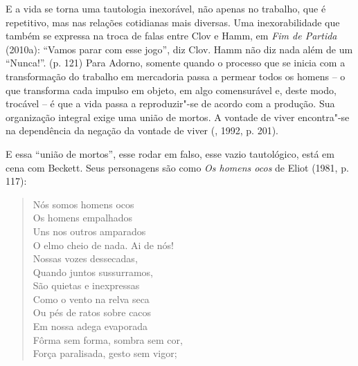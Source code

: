 E a vida se torna uma tautologia inexorável, não apenas no trabalho, que
é repetitivo, mas nas relações cotidianas mais diversas. Uma
inexorabilidade que também se expressa na troca de falas entre Clov e
Hamm, em \emph{Fim de Partida} (2010a): ``Vamos parar com esse jogo'',
diz Clov. Hamm não diz nada além de um ``Nunca!''. (p. 121) Para Adorno,
somente quando o processo que se inicia com a transformação do trabalho
em mercadoria passa a permear todos os homens -- o que transforma cada
impulso em objeto, em algo comensurável e, deste modo, trocável -- é que
a vida passa a reproduzir"-se de acordo com a produção. Sua organização
integral exige uma união de mortos. A vontade de viver encontra"-se na
dependência da negação da vontade de viver (, 1992, p. 201).

E essa ``união de mortos'', esse rodar em falso, esse vazio tautológico,
está em cena com Beckett. Seus personagens são como \emph{Os
homens ocos} de Eliot (1981, p. 117):

\begin{verse}
Nós somos homens ocos\\
Os homens empalhados\\
Uns nos outros amparados\\
O elmo cheio de nada. Ai de nós!\\
Nossas vozes dessecadas,\\
Quando juntos sussurramos,\\
São quietas e inexpressas\\
Como o vento na relva seca\\
Ou pés de ratos sobre cacos\\
Em nossa adega evaporada\\
Fôrma sem forma, sombra sem cor,\\
Força paralisada, gesto sem vigor;
\end{verse}

